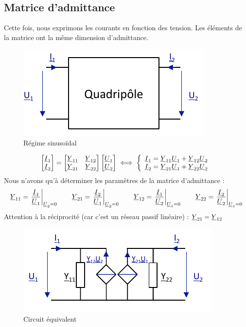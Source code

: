 \documentclass[12pt,a4paper]{article}
\newcommand{\uy}{\uline{Y} }
\newcommand{\ui}{\uline{I} }
\newcommand{\uu}{\uline{U} }
\begin{document}
\subsection{Matrice d'admittance}
Cette fois, nous exprimons les courants en fonction des tension. Les éléments de la matrice ont la même dimension d'admittance.
\begin{figure}[!h]
	\centering
	\includegraphics[scale=0.6]{images/matrice_impedance_sinu}
	\caption{Régime sinusoïdal}
\end{figure}
\begin{equation}
	\begin{bmatrix}
	\ui_1\\
	\ui_2
	\end{bmatrix} = 
	\begin{bmatrix}
		\uy_{11} & \uy_{12}\\
		\uy_{21} & \uy_{22}
	\end{bmatrix} \begin{bmatrix}
	\uu_1\\
	\uu_2
	\end{bmatrix} \iff \left\{\begin{array}{l}
\ui_1 = \uy_{11}\uu_1 + \uy_{12}\uu_2\\
\ui_2 = \uy_{21}\uu_1 + \uy_{22}\uu_2
\end{array}\right.
\label{equ: matrice admittance}
\end{equation}
Nous n'avons qu'à déterminer les paramètres de la matrice d'admittance :
\begin{equation}
	\uy_{11} = \left.\frac{\ui_1}{\uu_1}\right|_{\uu_2 = 0} \qquad
	\uy_{21} = \left.\frac{\ui_2}{\uu_1}\right|_{\uu_2 = 0} \qquad
	\uy_{12} = \left.\frac{\ui_1}{\uu_2}\right|_{\uu_1 = 0} \qquad
	\uy_{22} = \left.\frac{\ui_2}{\uu_2}\right|_{\uu_1 = 0}
\end{equation}
Attention à la réciprocité (car c'est un réseau passif linéaire) : $\uy_{21} = \uy_{12}$

\begin{figure}[!h]
	\centering
	\includegraphics[scale=0.7]{images/circuit_equi_admit}
	\caption{Circuit équivalent}
\end{figure}
\newpage
\end{document}
